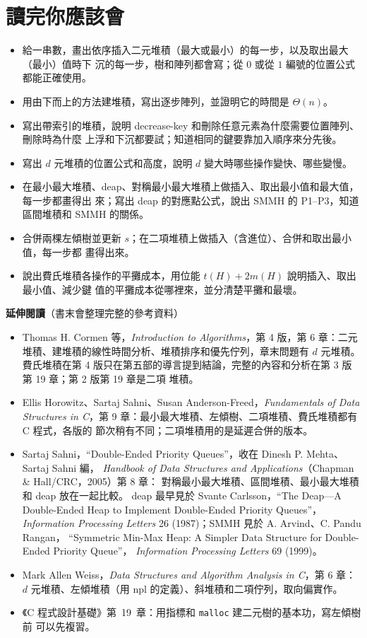 \section{讀完你應該會}
\label{sec:hp-checklist}

\begin{itemize}
\item 給一串數，畫出依序插入二元堆積（最大或最小）的每一步，以及取出最大（最小）值時下
沉的每一步，樹和陣列都會寫；從 $0$ 或從 $1$ 編號的位置公式都能正確使用。
\item 用由下而上的方法建堆積，寫出逐步陣列，並證明它的時間是 $\Theta(n)$。
\item 寫出帶索引的堆積，說明 decrease-key 和刪除任意元素為什麼需要位置陣列、刪除時為什麼
上浮和下沉都要試；知道相同的鍵要靠加入順序來分先後。
\item 寫出 $d$ 元堆積的位置公式和高度，說明 $d$ 變大時哪些操作變快、哪些變慢。
\item 在最小最大堆積、deap、對稱最小最大堆積上做插入、取出最小值和最大值，每一步都畫得出
來；寫出 deap 的對應點公式，說出 SMMH 的 P1--P3，知道區間堆積和 SMMH 的關係。
\item 合併兩棵左傾樹並更新 $s$；在二項堆積上做插入（含進位）、合併和取出最小值，每一步都
畫得出來。
\item 說出費氏堆積各操作的平攤成本，用位能 $t(H) + 2m(H)$ 說明插入、取出最小值、減少鍵
值的平攤成本從哪裡來，並分清楚平攤和最壞。
\end{itemize}

\textbf{延伸閱讀}（書末會整理完整的參考資料）

\begin{itemize}
\item Thomas H. Cormen 等，\textit{Introduction to Algorithms}，第 4 版，第 6 章：二元
堆積、建堆積的線性時間分析、堆積排序和優先佇列，章末問題有 $d$ 元堆積。 費氏堆積在第
4 版只在第五部的導言提到結論，完整的內容和分析在第 3 版第 19 章；第 2 版第 19 章是二項
堆積。
\item Ellis Horowitz、Sartaj Sahni、Susan Anderson-Freed，\textit{Fundamentals of Data
Structures in C}，第 9 章：最小最大堆積、左傾樹、二項堆積、費氏堆積都有 C 程式，各版的
節次稍有不同；二項堆積用的是延遲合併的版本。
\item Sartaj Sahni，``Double-Ended Priority Queues''，收在 Dinesh P. Mehta、Sartaj Sahni 編，
\textit{Handbook of Data Structures and Applications}（Chapman \& Hall/CRC，2005）第 8 章：
對稱最小最大堆積、區間堆積、最小最大堆積和 deap 放在一起比較。 deap 最早見於 Svante
Carlsson，``The Deap---A Double-Ended Heap to Implement Double-Ended Priority Queues''，
\textit{Information Processing Letters} 26 (1987)；SMMH 見於 A. Arvind、C. Pandu Rangan，
``Symmetric Min-Max Heap: A Simpler Data Structure for Double-Ended Priority Queue''，
\textit{Information Processing Letters} 69 (1999)。
\item Mark Allen Weiss，\textit{Data Structures and Algorithm Analysis in C}，第 6 章：
$d$ 元堆積、左傾堆積（用 npl 的定義）、斜堆積和二項佇列，取向偏實作。
\item 《C 程式設計基礎》第~19~章：用指標和 \texttt{malloc} 建二元樹的基本功，寫左傾樹前
可以先複習。
\end{itemize}


